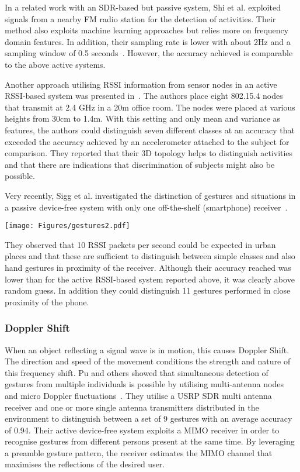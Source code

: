 \documentclass[journal]{IEEEtran}
\begin{document}
\begin{figure*}
In a related work with an SDR-based but passive system, Shi et al. exploited signals from a nearby FM radio station for the detection of activities.
Their method also exploits machine learning approaches but relies more on frequency domain features.
In addition, their sampling rate is lower with about 2Hz and a sampling window of 0.5 seconds~\cite{Pervasive_Shi_2012, Pervasive_Shi_2012b, DeviceFreeRecognition_Shi_2013}. 
However, the accuracy achieved is comparable to the above active systems.

Another approach utilising RSSI information from sensor nodes in an active RSSI-based system was presented in~\cite{Pervasive_Scholz_2013}.
The authors place eight 802.15.4 nodes that transmit at 2.4 GHz in a 20m office room.
The nodes were placed at various heights from 30cm to 1.4m.
With this setting and only mean and variance as features, the authors could distinguish seven different classes at an accuracy that exceeded the accuracy achieved by an accelerometer attached to the subject for comparison. 
They reported that their 3D topology helps to distinguish activities and that there are indications that discrimination of subjects might also be possible.

Very recently, Sigg et al. investigated the distinction of gestures and situations in a passive device-free system with only one off-the-shelf (smartphone) receiver~\cite{Pervasive_Sigg_2014,RFSensing_Sigg_2014}.
\begin{figure*}
 \texttt{[image: Figures/gestures2.pdf]}
 \caption{Gestures recognised via RSSI fluctuation on an off-the-shelf mobile phone~\cite{RFSensing_Sigg_2014}}
 \label{figureGestures}
\end{figure*}
They observed that 10 RSSI packets per second could be expected in urban places and that these are sufficient to distinguish between simple classes and also hand gestures in proximity of the receiver.
Although their accuracy reached was lower than for the active RSSI-based system reported above, it was clearly above random guess.
In addition they could distinguish 11 gestures performed in close proximity of the phone.

\subsubsection{Doppler Shift}
When an object reflecting a signal wave is in motion, this causes Doppler Shift. 
The direction and speed of the movement conditions the strength and nature of this frequency shift.
Pu and others showed that simultaneous detection of gestures from multiple individuals is possible by utilising multi-antenna nodes and micro Doppler fluctuations~\cite{RFsensing_Pu_2013,RFsensing_Kim_2009}.
They utilise a USRP SDR multi antenna receiver and one or more single antenna transmitters distributed in the environment to distinguish between a set of 9 gestures with an average accuracy of 0.94. 
Their active device-free system exploits a MIMO receiver in order to recognise gestures from different persons present at the same time. 
By leveraging a preamble gesture pattern, the receiver estimates the MIMO channel that maximises the reflections of the desired user.


\end{figure*}
\end{document}
